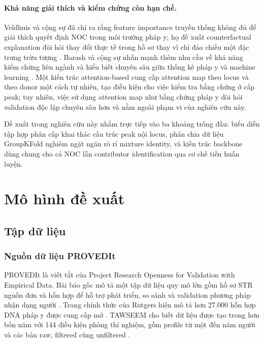 \documentclass[12pt,a4paper]{article}
\begin{document}
\paragraph{Khả năng giải thích và kiểm chứng còn hạn chế.}
Veldhuis và cộng sự đã chỉ ra rằng feature importance truyền thống không đủ để giải thích quyết định NOC trong môi trường pháp y; họ đề xuất counterfactual explanation đòi hỏi thay đổi thực tế trong hồ sơ thay vì chỉ đảo chiều một đặc trưng trừu tượng \cite{veldhuis2022}. Barash và cộng sự nhấn mạnh thêm nhu cầu về khả năng kiểm chứng liên ngành và hiểu biết chuyên sâu giữa thống kê pháp y và machine learning \cite{barash2024}. Một kiến trúc attention-based cung cấp attention map theo locus và theo donor một cách tự nhiên, tạo điều kiện cho việc kiểm tra bằng chứng ở cấp peak; tuy nhiên, việc sử dụng attention map như bằng chứng pháp y đòi hỏi validation độc lập chuyên sâu hơn và nằm ngoài phạm vi của nghiên cứu này.

Đề xuất trong nghiên cứu này nhắm trực tiếp vào ba khoảng trống đầu: biểu diễn tập hợp phân cấp khai thác cấu trúc peak nội locus, phân chia dữ liệu GroupKFold nghiêm ngặt ngăn rò rỉ mixture identity, và kiến trúc backbone dùng chung cho cả NOC lẫn contributor identification qua cơ chế tiền huấn luyện.

\section{Mô hình đề xuất}
\label{sec:model}

\subsection{Tập dữ liệu}

\subsubsection{Nguồn dữ liệu PROVEDIt}

PROVEDIt là viết tắt của Project Research Openness for Validation with Empirical Data. Bài báo gốc mô tả một tập dữ liệu quy mô lớn gồm hồ sơ STR nguồn đơn và hỗn hợp để hỗ trợ phát triển, so sánh và validation phương pháp nhận dạng người \cite{provedit2018}. Trang chính thức của Rutgers hiện mô tả hơn 27.000 hỗn hợp DNA pháp y được cung cấp mở \cite{proveditweb}. TAWSEEM cho biết dữ liệu được tạo trong hơn bốn năm với 144 điều kiện phòng thí nghiệm, gồm profile từ một đến năm người và các bản raw, filtered cùng unfiltered \cite{alamoudi2022}.
\end{document}
